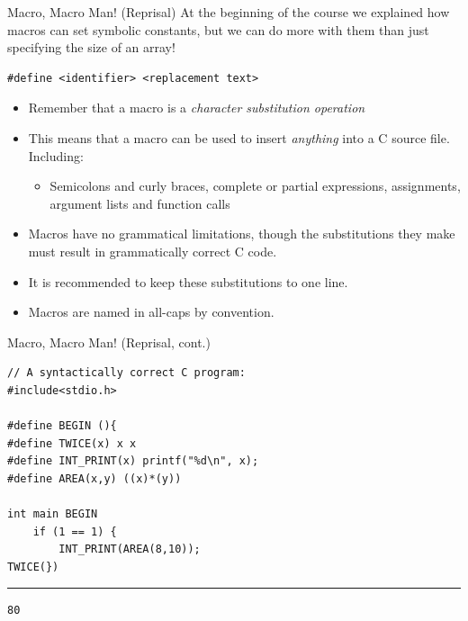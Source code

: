 \documentclass[11pt]{beamer}
\begin{document}
\begin{frame}[fragile=singleslide]{Macro, Macro Man! (Reprisal)}
At the beginning of the course we explained how macros can set symbolic constants, but we can do more with them than just specifying the size of an array! 
\begin{lstlisting}[style=C]
#define <identifier> <replacement text>
\end{lstlisting}
\begin{itemize}
\item Remember that a macro is a \emph{character substitution operation}
\item This means that a macro can be used to insert \emph{anything} into a C source file. Including:
\begin{itemize}
\item Semicolons and curly braces, complete or partial expressions, assignments, argument lists and function calls
\end{itemize}
\item Macros have no grammatical limitations, though the substitutions they make must result in grammatically correct C code. 
\item It is recommended to keep these substitutions to one line.
\item Macros are named in all-caps by convention.
\end{itemize}
\end{frame}

\begin{frame}[fragile=singleslide]{Macro, Macro Man! (Reprisal, cont.)}
\begin{lstlisting}[style=C]
// A syntactically correct C program: 
#include<stdio.h>

#define BEGIN (){
#define TWICE(x) x x
#define INT_PRINT(x) printf("%d\n", x);
#define AREA(x,y) ((x)*(y))

int main BEGIN
	if (1 == 1) {
		INT_PRINT(AREA(8,10));
TWICE(})
\end{lstlisting}
\hrule
\begin{verbatim}
80
\end{verbatim}
\end{frame}
\end{document}
